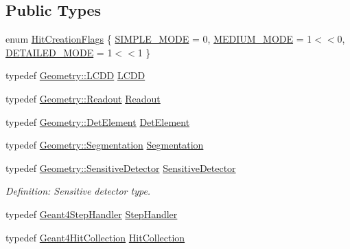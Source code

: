 \subsection*{Public Types}
\begin{DoxyCompactItemize}
\item 
enum \hyperlink{class_d_d4hep_1_1_simulation_1_1_geant4_sensitive_a496cf61e393c9c2f096f60a4ee20c750}{HitCreationFlags} \{ \hyperlink{class_d_d4hep_1_1_simulation_1_1_geant4_sensitive_a496cf61e393c9c2f096f60a4ee20c750affa871d1db60d0783987ac12ad64663f}{SIMPLE\_\-MODE} =  0, 
\hyperlink{class_d_d4hep_1_1_simulation_1_1_geant4_sensitive_a496cf61e393c9c2f096f60a4ee20c750a7293a18844334c7e1ed078b7e593e4d9}{MEDIUM\_\-MODE} =  1$<$$<$0, 
\hyperlink{class_d_d4hep_1_1_simulation_1_1_geant4_sensitive_a496cf61e393c9c2f096f60a4ee20c750a3327f21d3b9852572e79cca4b399628d}{DETAILED\_\-MODE} =  1$<$$<$1
 \}
\item 
typedef \hyperlink{class_d_d4hep_1_1_geometry_1_1_l_c_d_d}{Geometry::LCDD} \hyperlink{class_d_d4hep_1_1_simulation_1_1_geant4_sensitive_a3373caa6917867ca7c871df20fb467c8}{LCDD}
\item 
typedef \hyperlink{class_d_d4hep_1_1_geometry_1_1_readout}{Geometry::Readout} \hyperlink{class_d_d4hep_1_1_simulation_1_1_geant4_sensitive_a2dc0e9ab41aeebbb0bad179419eeac72}{Readout}
\item 
typedef \hyperlink{class_d_d4hep_1_1_geometry_1_1_det_element}{Geometry::DetElement} \hyperlink{class_d_d4hep_1_1_simulation_1_1_geant4_sensitive_a1cb1af5fb1194be1e1c1137f1e54272b}{DetElement}
\item 
typedef \hyperlink{class_d_d4hep_1_1_geometry_1_1_segmentation}{Geometry::Segmentation} \hyperlink{class_d_d4hep_1_1_simulation_1_1_geant4_sensitive_ac898770dc0c398f3b7b88d1bf5f72314}{Segmentation}
\item 
typedef \hyperlink{class_d_d4hep_1_1_geometry_1_1_sensitive_detector}{Geometry::SensitiveDetector} \hyperlink{class_d_d4hep_1_1_simulation_1_1_geant4_sensitive_a985a23f6592b3ab41b9aa45e47fbc9ea}{SensitiveDetector}
\begin{DoxyCompactList}\small\item\em Definition: Sensitive detector type. \item\end{DoxyCompactList}\item 
typedef \hyperlink{class_d_d4hep_1_1_simulation_1_1_geant4_step_handler}{Geant4StepHandler} \hyperlink{class_d_d4hep_1_1_simulation_1_1_geant4_sensitive_a6df3adaabfad8e56f08282f2cf70a9b7}{StepHandler}
\item 
typedef \hyperlink{class_d_d4hep_1_1_simulation_1_1_geant4_hit_collection}{Geant4HitCollection} \hyperlink{class_d_d4hep_1_1_simulation_1_1_geant4_sensitive_a160ee45c4477c7165b1d56d377e5582f}{HitCollection}
\end{DoxyCompactItemize}
